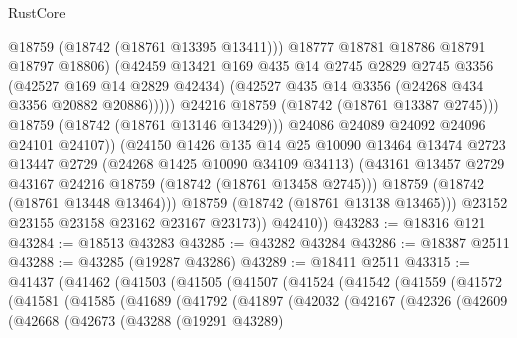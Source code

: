 \begin{lexlean}{RustCore}
\begin{coremodule}
                              @18759
                              (@18742 (@18761 @13395 @13411)))
                            @18777
                            @18781
                            @18786
                            @18791
                            @18797
                            @18806)
                          (@42459
                            @13421
                            @169
                            @435
                            @14
                            @2745
                            @2829
                            @2745
                            @3356
                            (@42527 @169 @14 @2829 @42434)
                            (@42527 @435 @14 @3356 (@24268 @434 @3356 @20882 @20886)))))
                      @24216
                      @18759
                      (@18742 (@18761 @13387 @2745)))
                    @18759
                    (@18742 (@18761 @13146 @13429)))
                  @24086
                  @24089
                  @24092
                  @24096
                  @24101
                  @24107))
              (@24150
                @1426
                @135
                @14
                @25
                @10090
                @13464
                @13474
                @2723
                @13447
                @2729
                (@24268 @1425 @10090 @34109 @34113)
                (@43161 @13457 @2729 @43167 @24216 @18759 (@18742 (@18761 @13458 @2745)))
                @18759
                (@18742 (@18761 @13448 @13464)))
              @18759
              (@18742 (@18761 @13138 @13465)))
            @23152
            @23155
            @23158
            @23162
            @23167
            @23173))
        @42410))
@43283 := @18316 @121
@43284 := @18513 @43283
@43285 := @43282 @43284
@43286 := @18387 @2511
@43288 := @43285 (@19287 @43286)
@43289 := @18411 @2511
@43315 := @41437
    (@41462
      (@41503
        (@41505
          (@41507
            (@41524
              (@41542
                (@41559
                  (@41572
                    (@41581
                      (@41585
                        (@41689
                          (@41792
                            (@41897
                              (@42032
                                (@42167
                                  (@42326
                                    (@42609
                                      (@42668
                                        (@42673
                                          (@43288
                                            (@19291 @43289)

\end{coremodule}
\end{lexlean}
